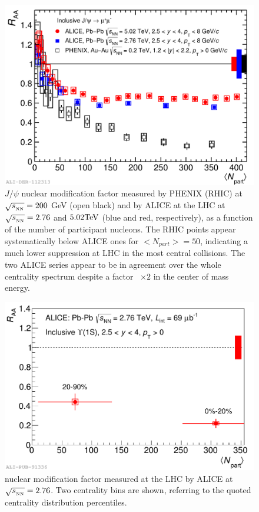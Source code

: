 \begin{figure}[!t]
\begin{center}
\includegraphics[width=0.8\linewidth]{Chapters/Analysis/Figs/2016-Sep-15-RAA_centr_Alice5_Alice276_Phenix.pdf}
\caption{$J/\psi$ nuclear modification factor measured by PHENIX (RHIC) at $\sqrt{s_{_{\rm NN}}}=200$ GeV (open black) and by ALICE at the LHC at $\sqrt{s_{_{\rm NN}}}=2.76$ and $5.02 \rm{TeV}$ (blue and red, respectively), as a function of the number of participant nucleons. The RHIC points appear systematically below ALICE ones for $<N_{part}>=50$, indicating a much lower suppression at LHC in the most central collisions. The two ALICE series appear to be in agreement over the whole centrality spectrum despite a factor ~$\times2$ in the center of mass energy. }
\label{fig:LHC_RHIC_jpsi}
\end{center}
\end{figure}

\begin{figure}[!t]
\begin{center}
\includegraphics[width=0.8\linewidth]{Chapters/Analysis/Figs/2014-Dec-16-Raa_centr.pdf}
\caption{\upsi nuclear modification factor measured at the LHC by ALICE at $\sqrt{s_{_{\rm NN}}}=2.76$. Two centrality bins are shown, referring to the quoted centrality distribution percentiles.}
\label{fig:LHC_upsi}
\end{center}
\end{figure}

